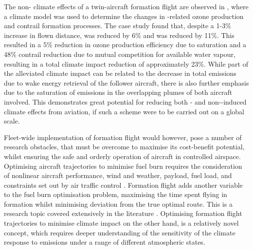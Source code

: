 The non- climate effects of a twin-aircraft formation flight are observed in \cite{Dahlmann2020}, where a climate model was used to determine the changes in -related ozone production and contrail formation processes. The case study found that, despite a 1-3\% increase in flown distance,  was reduced by 6\% and  was reduced by 11\%. This resulted in a 5\% reduction in ozone production efficiency due to   saturation and a 48\% contrail reduction due to mutual competition for available water vapour, resulting in a total climate impact reduction of approximately 23\%. While part of the alleviated climate impact can be related to the decrease in total emissions due to wake energy retrieval of the follower aircraft, there is also further emphasis due to the saturation of emissions in the overlapping plumes of both aircraft involved. This demonstrates great potential for reducing both - and non--induced climate effects from aviation, if such a scheme were to be carried out on a global scale.

Fleet-wide implementation of formation flight would however, pose a number of research obstacles, that must be overcome to maximise its cost-benefit potential, whilst ensuring the safe and orderly operation of aircraft in controlled airspace. Optimising aircraft trajectories to minimise fuel burn requires the consideration of nonlinear aircraft performance, wind and weather, payload, fuel load, and constraints set out by air traffic control \cite{Soler2015}. Formation flight adds another variable to the fuel burn optimisation problem, maximising the time spent flying in formation whilst minimising deviation from the true optimal route. This is a research topic covered extensively in the literature  \cite{Ning2011, Hartjes2019}. Optimising formation flight trajectories to minimise climate impact on the other hand, is a relatively novel concept, which requires deeper understanding of the sensitivity of the climate response to emissions under a range of different atmospheric states. 
